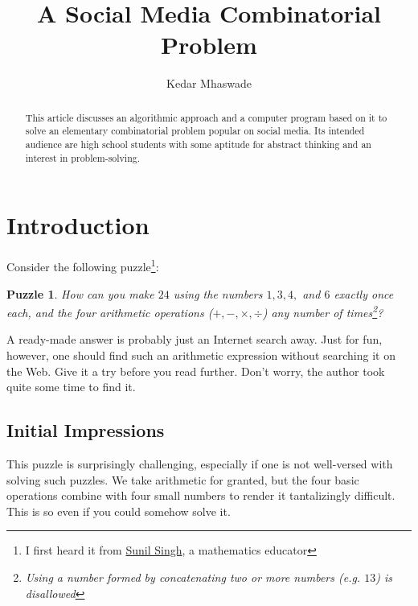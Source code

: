\documentclass[english,smartquotes]{hgbarticle}
\newtheorem{question}{Puzzle}
\begin{document}

\author{
	Kedar Mhaswade\\ 
}
\title{A Social Media Combinatorial Problem}
\date{}

\maketitle

\begin{abstract}\noindent
This article discusses an algorithmic approach and a computer program based on it
to solve an elementary combinatorial problem popular on social media. Its intended
audience are high school students with some aptitude for abstract thinking and
an interest in problem-solving.
\end{abstract}


\section{Introduction}

Consider the following puzzle\footnote{I first heard it from \href{https://sunilsingh-42118.medium.com/}{Sunil Singh}, a mathematics educator}:

\begin{question}
\label{puzzle}
How can you make $24$ using the numbers $1, 3, 4,$ and $6$ exactly once each, and the four arithmetic operations ($+, -, \times, \div$) any number of times\footnote{Using a number formed by concatenating two or more numbers (e.g. $13$) is disallowed}?
\end{question}

A ready-made answer is probably just an Internet search away. Just for fun, however, one should find such an arithmetic expression without searching it on the Web. Give it a try before you read further. Don't worry, the author took quite some time to find it.

\subsection{Initial Impressions}
This puzzle is surprisingly challenging, especially if one is not well-versed with solving such puzzles. We take arithmetic for granted, but the four basic operations combine with four small numbers to render it tantalizingly difficult. This is so even if you could somehow solve it.
\end{document}
